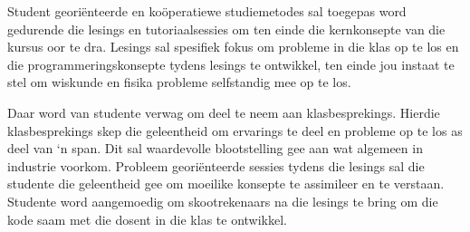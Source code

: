     Student geori\"{e}nteerde en ko\"{o}peratiewe studiemetodes sal toegepas
    word gedurende die lesings en tutoriaalsessies om ten einde die
    kernkonsepte van die kursus oor te dra.  Lesings sal spesifiek fokus om
    probleme in die klas op te los en die programmeringskonsepte tydens lesings
    te ontwikkel, ten einde jou instaat te stel om wiskunde en fisika probleme
    selfstandig mee op te los.

    Daar word van studente verwag om deel te neem aan klasbesprekings. Hierdie
    klasbesprekings skep die geleentheid om ervarings te deel en probleme op te
    los as deel van `n span.  Dit sal waardevolle blootstelling gee aan wat
    algemeen in industrie voorkom. Probleem geori\"{e}nteerde sessies tydens
    die lesings sal die studente die geleentheid gee om moeilike konsepte te
    assimileer en te verstaan. Studente word aangemoedig om skootrekenaars na
    die lesings te bring om die kode saam met die dosent in die klas te
    ontwikkel.

